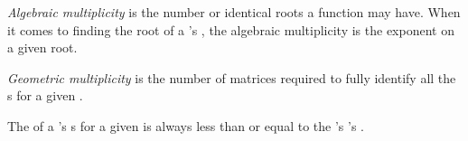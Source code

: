 \begin{definition}\label{def:Algebraic_Multiplicity}
  \emph{Algebraic multiplicity} is the number or identical roots a function may have.
  When it comes to finding the root of a 's , the algebraic multiplicity is the exponent on a given root.
\end{definition}

\begin{definition}\label{def:Geometric_Multiplicity}
  \emph{Geometric multiplicity} is the number of matrices required to fully identify all the s for a given .
\end{definition}

\begin{theorem}\label{thm:Geometric_Algebraic_Multiplicity}
  The  of a 's s for a given  is always less than or equal to the 's 's .
\end{theorem}

